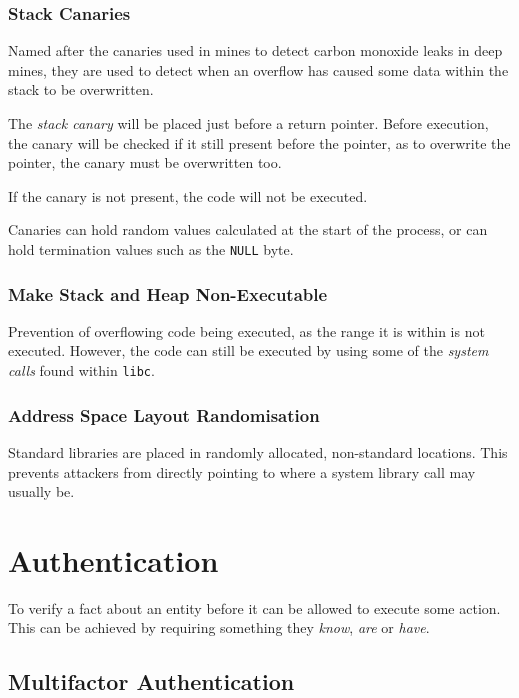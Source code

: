 \documentclass{article}
\begin{document}
\subsubsection{Stack Canaries}

Named after the canaries used in mines to detect carbon monoxide leaks in deep mines, they are used to detect when an overflow has caused some data within the stack to be overwritten.

The \textit{stack canary} will be placed just before a return pointer. Before execution, the canary will be checked if it still present before the pointer, as to overwrite the pointer, the canary must be overwritten too.

If the canary is not present, the code will not be executed.

Canaries can hold random values calculated at the start of the process, or can hold termination values such as the \texttt{NULL} byte.

\subsubsection{Make Stack and Heap Non-Executable}

Prevention of overflowing code being executed, as the range it is within is not executed. However, the code can still be executed by using some of the \textit{system calls} found within \texttt{libc}.

\subsubsection{Address Space Layout Randomisation}

Standard libraries are placed in randomly allocated, non-standard locations. This prevents attackers from directly pointing to where a system library call may usually be.

\section{Authentication}

To verify a fact about an entity before it can be allowed to execute some action. This can be achieved by requiring something they \textit{know}, \textit{are} or \textit{have}.

\subsection{Multifactor Authentication}
\end{document}
